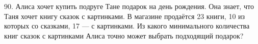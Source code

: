 90. Алиса хочет купить подруге Тане подарок на день рождения. Она знает, что Таня хочет книгу сказок с картинками. В магазине продаётся 23 книги, 10 из которых со сказками, 17 --- с картинками. Из какого минимального количества книг сказок с картинками Алиса точно может выбрать подходящий подарок?\\
